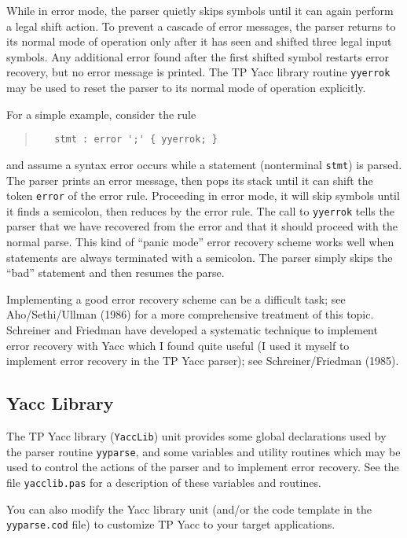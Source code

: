 While in error mode, the parser quietly skips symbols until it can again
perform a legal shift action. To prevent a cascade of error messages, the
parser returns to its normal mode of operation only after it has seen
and shifted three legal input symbols. Any additional error found after
the first shifted symbol restarts error recovery, but no error message
is printed. The TP Yacc library routine \verb"yyerrok" may be used to reset
the parser to its normal mode of operation explicitly.

For a simple example, consider the rule
\begin{quote}\begin{verbatim}
   stmt : error ';' { yyerrok; }
\end{verbatim}\end{quote}
and assume a syntax error occurs while a statement (nonterminal \verb"stmt")
is parsed. The parser prints an error message, then pops its stack until it
can shift the token \verb"error" of the error rule. Proceeding in error mode,
it will skip symbols until it finds a semicolon, then reduces by the error
rule. The call to \verb"yyerrok" tells the parser that we have recovered from
the error and that it should proceed with the normal parse. This kind of
``panic mode'' error recovery scheme works well when statements are always
terminated with a semicolon. The parser simply skips the ``bad'' statement
and then resumes the parse.

Implementing a good error recovery scheme can be a difficult task; see
Aho/Sethi/Ullman (1986) for a more comprehensive treatment of this topic.
Schreiner and Friedman have developed a systematic technique to implement
error recovery with Yacc which I found quite useful (I used it myself
to implement error recovery in the TP Yacc parser); see Schreiner/Friedman
(1985).

\subsection{Yacc Library}

The TP Yacc library (\verb"YaccLib") unit provides some global declarations
used by the parser routine \verb"yyparse", and some variables and utility
routines which may be used to control the actions of the parser and to
implement error recovery. See the file \verb"yacclib.pas" for a description
of these variables and routines.

You can also modify the Yacc library unit (and/or the code template in the
\verb"yyparse.cod" file) to customize TP Yacc to your target applications.

